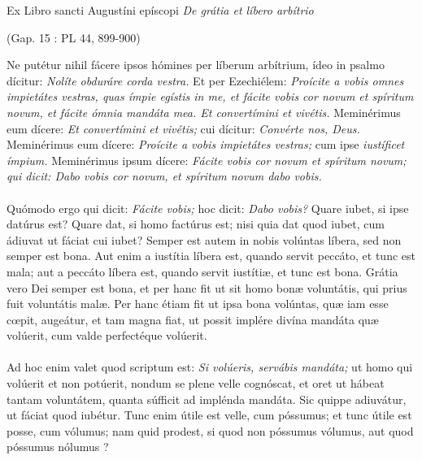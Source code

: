 \documentclass[options]{article}
\begin{document}
	Ex Libro sancti Augustíni epíscopi 
	\emph{De grátia et líbero arbítrio}
	\begin{flushright}
		(Gap. 15 : PL 44, 899-900)
	\end{flushright}
Ne putétur nihil fácere ipsos hómines per líberum arbítrium, ídeo in psalmo dícitur: 
\emph{Nolíte obduráre corda vestra.}
Et per Ezechiélem:
\emph{Proícite a vobis omnes impietátes vestras, quas ímpie egístis in me, et fácite vobis cor novum et spíritum novum, et fácite ómnia mandáta mea. Et convertímini et vivétis.}
Meminérimus eum dícere:
\emph{Et convertímini et vivétis;}
cui dícitur:
\emph{Convérte nos, Deus.}
Meminérimus eum dícere:
\emph{Proícite a vobis impietátes vestras;}
cum ipse
\emph{iustíficet ímpium.}
Meminérimus ipsum dícere:
\emph{Fácite vobis cor novum et spíritum novum; qui dicit: Dabo vobis cor novum, et spíritum novum dabo vobis.}\\
\\
Quómodo ergo qui dicit:
\emph{Fácite vobis;}
 hoc dicit:
 \emph{Dabo vobis?}
 Quare iubet, si ipse datúrus est? Quare dat, si homo factúrus est; nisi quia dat quod iubet, cum ádiuvat ut fáciat cui iubet? Semper est autem in nobis volúntas líbera, sed non semper est bona. Aut enim a iustítia líbera est, quando servit peccáto, et tunc est mala; aut a peccáto líbera est, quando servit iustítiæ, et tunc est bona. Grátia vero Dei semper est bona, et per hanc fit ut sit homo bonæ voluntátis, qui prius fuit voluntátis malæ. Per hanc étiam fit ut ipsa bona volúntas, quæ iam esse cœpit, augeátur, et tam magna fiat, ut possit implére divína mandáta quæ volúerit, cum valde perfectéque volúerit.\\
 \\
 Ad hoc enim valet quod scriptum est:
 \emph{Si volúeris, servábis mandáta;}
 ut homo qui volúerit et non potúerit, nondum se plene velle cognóscat, et oret ut hábeat tantam voluntátem, quanta súfficit ad implénda mandáta. Sic quippe adiuvátur, ut fáciat quod iubétur. Tunc enim útile est velle, cum póssumus; et tunc útile est posse, cum vólumus; nam quid prodest, si quod non póssumus vólumus, aut quod póssumus nólumus ?
\end{document}
